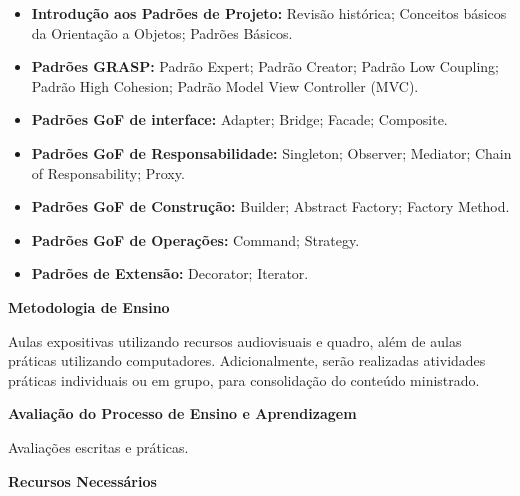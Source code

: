 \begin{itemize}

 \item \textbf{Introdução aos Padrões de Projeto:} Revisão histórica; Conceitos básicos da Orientação a Objetos; Padrões Básicos.

 \item \textbf{Padrões GRASP: } Padrão Expert; Padrão Creator; Padrão Low Coupling; Padrão High Cohesion; Padrão Model View Controller (MVC).

 \item \textbf{Padrões GoF de interface:}  Adapter; Bridge; Facade; Composite.

 \item \textbf{Padrões GoF de Responsabilidade:} Singleton; Observer; Mediator; Chain of Responsability; Proxy.

 \item \textbf{Padrões GoF de Construção:} Builder; Abstract Factory; Factory Method.

 \item \textbf{Padrões GoF de Operações:} Command; Strategy.

 \item \textbf{Padrões de Extensão:} Decorator; Iterator.

\end{itemize}

\begin{snugshade}\begin{center}\textbf{
    Metodologia de Ensino
}\end{center}\end{snugshade} 

\noindent
   Aulas expositivas utilizando recursos audiovisuais e quadro, além de aulas práticas utilizando computadores. Adicionalmente, serão realizadas atividades práticas individuais ou em grupo, para consolidação do conteúdo ministrado.

\begin{snugshade}\begin{center}\textbf{
    Avaliação do Processo de Ensino e Aprendizagem
}\end{center}\end{snugshade}   

\noindent
   Avaliações escritas e práticas.

\begin{snugshade}\begin{center}\textbf{
    Recursos Necessários
    \vphantom{q} %
}\end{center}\end{snugshade}

